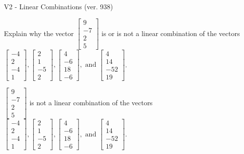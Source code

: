 \begin{exercise}
  \begin{exerciseTitle}V2 - Linear Combinations (ver. 938)\end{exerciseTitle}
  \begin{exerciseStatement}
    Explain why the vector \(\left[\begin{array}{c}
9 \\
-7 \\
2 \\
5
\end{array}\right]\)  is or is not a linear 
	combination of the vectors \(\left[\begin{array}{c}
-4 \\
2 \\
-4 \\
1
\end{array}\right] , \left[\begin{array}{c}
2 \\
1 \\
-5 \\
2
\end{array}\right] , \left[\begin{array}{c}
4 \\
-6 \\
18 \\
-6
\end{array}\right] , \text{ and } \left[\begin{array}{c}
4 \\
14 \\
-52 \\
19
\end{array}\right]\).
	


  \end{exerciseStatement}
  \begin{exerciseAnswer}
   \(\left[\begin{array}{c}
9 \\
-7 \\
2 \\
5
\end{array}\right]\) 
  	 is not  
	a linear combination of the vectors \(\left[\begin{array}{c}
-4 \\
2 \\
-4 \\
1
\end{array}\right] , \left[\begin{array}{c}
2 \\
1 \\
-5 \\
2
\end{array}\right] , \left[\begin{array}{c}
4 \\
-6 \\
18 \\
-6
\end{array}\right] , \text{ and } \left[\begin{array}{c}
4 \\
14 \\
-52 \\
19
\end{array}\right]\).


\end{exerciseAnswer}
\end{exercise}
